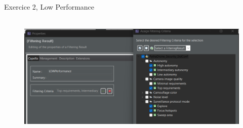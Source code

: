 \documentclass[aspectratio=1610]{beamer}
\begin{document}
    \begin{frame}{Exercice 2, Low Performance}
        \begin{figure}[H]
            \centering
            \includegraphics[width=\textwidth, height=6cm, keepaspectratio]{./images/EX2/CSC_5RO08_TA_EX2_Filter_Low.png}
        \end{figure}
    \end{frame}
\end{document}
